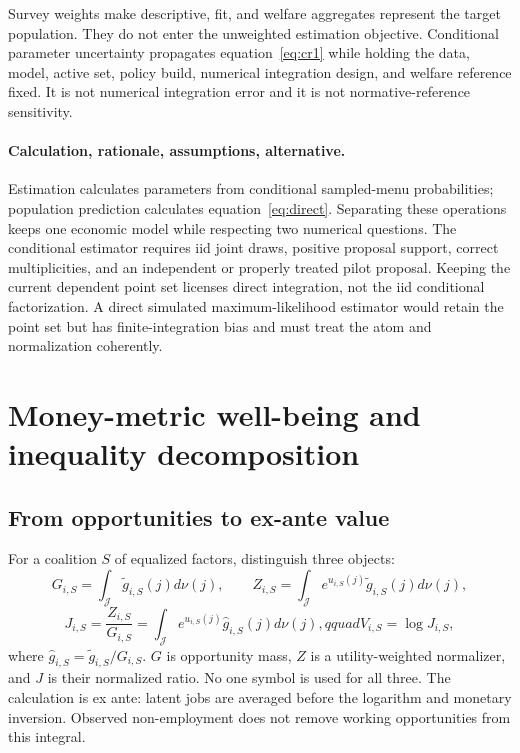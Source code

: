 \documentclass[11pt,a4paper]{article}
\begin{document}
Survey weights make descriptive, fit, and welfare aggregates represent the
target population. They do not enter the unweighted estimation objective.
Conditional parameter uncertainty propagates equation~\eqref{eq:cr1} while
holding the data, model, active set, policy build, numerical integration design,
and welfare reference fixed. It is not numerical integration error and it is not
normative-reference sensitivity.

\paragraph{Calculation, rationale, assumptions, alternative.}
Estimation calculates parameters from conditional sampled-menu probabilities;
population prediction calculates equation~\eqref{eq:direct}. Separating these
operations keeps one economic model while respecting two numerical questions.
The conditional estimator requires iid joint draws, positive proposal support,
correct multiplicities, and an independent or properly treated pilot proposal.
Keeping the current dependent point set licenses direct integration, not the
iid conditional factorization. A direct simulated maximum-likelihood estimator
would retain the point set but has finite-integration bias and must treat the atom
and normalization coherently.

\section{Money-metric well-being and inequality decomposition}

\subsection{From opportunities to ex-ante value}

For a coalition $S$ of equalized factors, distinguish three objects:
\begin{equation}
G_{i,S}=\int_{\mathcal J}\widetilde g_{i,S}(j)d\nu(j),\qquad
Z_{i,S}=\int_{\mathcal J}e^{u_{i,S}(j)}\widetilde g_{i,S}(j)d\nu(j),
\end{equation}
\begin{equation}
J_{i,S}=\frac{Z_{i,S}}{G_{i,S}}=
\int_{\mathcal J}e^{u_{i,S}(j)}\widehat g_{i,S}(j)d\nu(j),qquad
V_{i,S}=\log J_{i,S},
\label{eq:value}
\end{equation}
where $\widehat g_{i,S}=\widetilde g_{i,S}/G_{i,S}$. $G$ is opportunity mass,
$Z$ is a utility-weighted normalizer, and $J$ is their normalized ratio. No one
symbol is used for all three. The calculation is ex ante: latent jobs are
averaged before the logarithm and monetary inversion. Observed non-employment
does not remove working opportunities from this integral.
\end{document}
